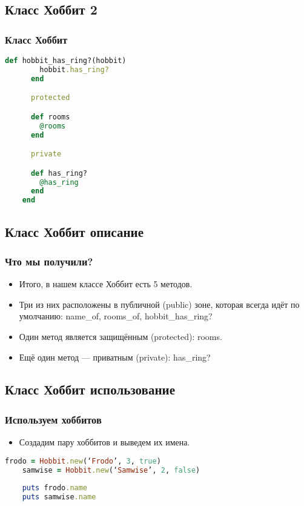 \documentclass[compress,red]{beamer}
\begin{document}
\subsection{Класс Хоббит 2}
\begin{frame}[fragile]
  \frametitle{Класс Хоббит}
  \scriptsize{
  \begin{lstlisting}[language=ruby,basicstyle=\footnotesize,label=ruby2,caption=Класс Хоббит]
      def hobbit_has_ring?(hobbit)
        hobbit.has_ring?
      end

      protected

      def rooms
        @rooms
      end

      private

      def has_ring?
        @has_ring
      end
    end
  \end{lstlisting}
  }
\end{frame}

\subsection{Класс Хоббит описание}
\begin{frame}[fragile]
  \frametitle{Что мы получили?}
  \begin{itemize}
    \item Итого, в нашем классе Хоббит есть 5 методов.
    \item Три из них расположены в публичной (public) зоне, которая всегда идёт по умолчанию: name\_of, rooms\_of, hobbit\_has\_ring?
    \item Один метод является защищённым (protected): rooms.
    \item Ещё один метод --- приватным (private): has\_ring?
  \end{itemize}
\end{frame}

\subsection{Класс Хоббит использование}
\begin{frame}[fragile]
  \frametitle{Используем хоббитов}
  \begin{itemize}
    \item Создадим пару хоббитов и выведем их имена.
  \end{itemize}
  \scriptsize{
  \begin{lstlisting}[language=ruby,basicstyle=\footnotesize,label=ruby3,caption=Использование Хоббита]
    frodo = Hobbit.new(‘Frodo’, 3, true)
    samwise = Hobbit.new(‘Samwise’, 2, false)
    
    puts frodo.name
    puts samwise.name
  \end{lstlisting}
  }
\end{frame}
\end{document}
